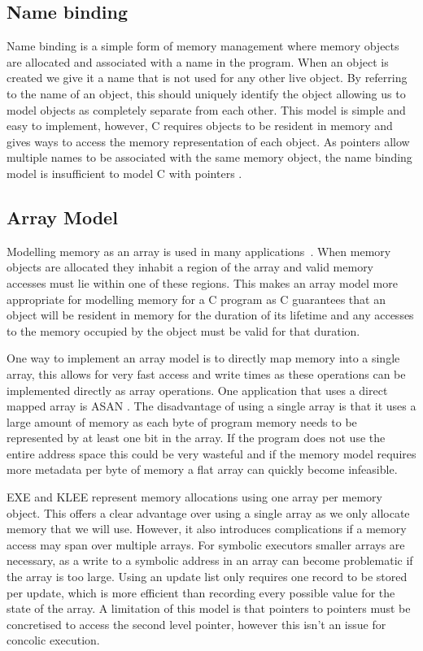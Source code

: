 \documentclass[12pt,twoside]{report}
\begin{document}
\subsection{Name binding}
Name binding is a simple form of memory management where memory objects are allocated and associated with a name in the program. When an object is created we give it a name that is not used for any other live object. By referring to the name of an object, this should uniquely identify the object allowing us to model objects as completely separate from each other. This model is simple and easy to implement, however, C requires objects to be resident in memory and gives ways to access the memory representation of each object. As pointers allow multiple names to be associated with the same memory object, the name binding model is insufficient to model C with pointers \cite{xu2010memory}.

\subsection{Array Model}
Modelling memory as an array is used in many applications~\cite{cadar2008klee,cadar2008exe,leroy2008formal,poeplau2020symbolic}. When memory objects are allocated they inhabit a region of the array and valid memory accesses must lie within one of these regions. This makes an array model more appropriate for modelling memory for a C program as C guarantees that an object will be resident in memory for the duration of its lifetime and any accesses to the memory occupied by the object must be valid for that duration.

One way to implement an array model is to directly map memory into a single array, this allows for very fast access and write times as these operations can be implemented directly as array operations. One application that uses a direct mapped array is ASAN \cite{180957}. The disadvantage of using a single array is that it uses a large amount of memory as each byte of program memory needs to be represented by at least one bit in the array. If the program does not use the entire address space this could be very wasteful and if the memory model requires more metadata per byte of memory a flat array can quickly become infeasible.

EXE \cite{cadar2008exe} and KLEE \cite{cadar2008klee} represent memory allocations using one array per memory object. This offers a clear advantage over using a single array as we only allocate memory that we will use. However, it also introduces complications if a memory access may span over multiple arrays. For symbolic executors smaller arrays are necessary, as a write to a symbolic address in an array can become problematic if the array is too large. Using an update list only requires one record to be stored per update, which is more efficient than recording every possible value for the state of the array. A limitation of this model is that pointers to pointers must be concretised to access the second level pointer, however this isn't an issue for concolic execution.
\end{document}
